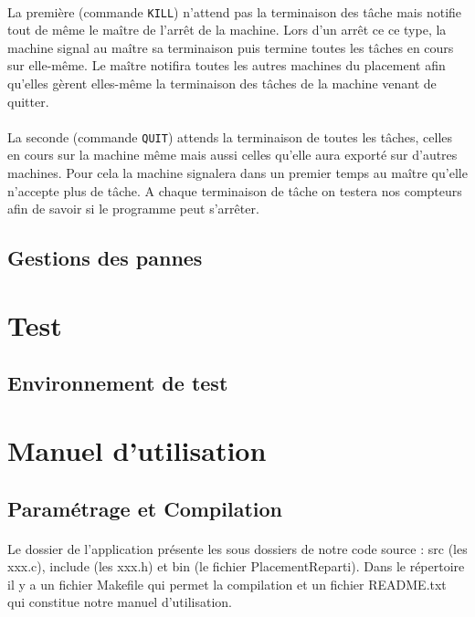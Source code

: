     \paragraph{}
    La première (commande \verb"KILL") n'attend pas la terminaison des 
    tâche mais notifie tout de même le maître de l'arrêt de la machine.
    Lors d'un arrêt ce ce type, la machine signal au maître sa 
    terminaison puis termine toutes les tâches en cours sur elle-même.
    Le maître notifira toutes les autres machines du placement afin 
    qu'elles gèrent elles-même la terminaison des tâches de la machine 
    venant de quitter.
    
    \paragraph{}
    La seconde (commande \verb"QUIT") attends la terminaison de toutes 
    les tâches, celles en cours sur la machine même mais aussi celles qu'elle 
    aura exporté sur d'autres machines. Pour cela la machine signalera 
    dans un premier temps au maître qu'elle n'accepte plus de tâche. 
    A chaque terminaison de tâche on testera nos compteurs afin de 
    savoir si le programme peut s'arrêter.
    
    \subsection{Gestions des pannes}
    
\section{Test}   
  \subsection{Environnement de test}
  
\section{Manuel d'utilisation}
   \subsection{Paramétrage et Compilation}
    \paragraph{}
    Le dossier de l'application présente les sous dossiers de notre code
    source : src (les xxx.c), include (les xxx.h) et bin (le fichier
    PlacementReparti). Dans le répertoire il y a un fichier Makefile qui
    permet la compilation et un fichier README.txt qui constitue notre
    manuel d'utilisation.

